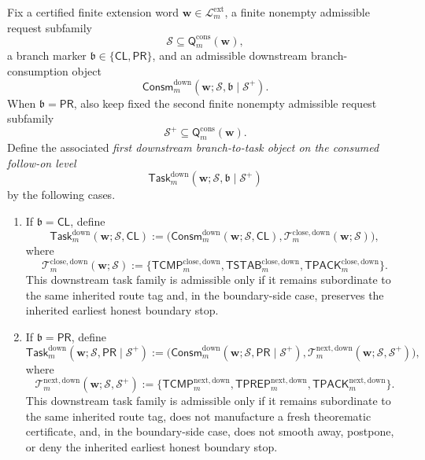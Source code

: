 \begin{definition}
\label{def:first-downstream-branch-to-task-object-on-the-consumed-follow-on-level}
Fix a certified finite extension word \(\mathbf w\in\mathcal L^{\mathrm{ext}}_{m}\), a finite nonempty admissible request subfamily
\[
 \mathcal S \subseteq \mathsf{Q}^{\mathrm{cons}}_{m}(\mathbf w),
\]
a branch marker \(\mathfrak b\in\{\mathsf{CL},\mathsf{PR}\}\), and an admissible downstream branch-consumption object
\[
 \mathsf{Consm}^{\mathrm{down}}_{m}(\mathbf w;\mathcal S,\mathfrak b\mid\mathcal S^{+}).
\]
When \(\mathfrak b=\mathsf{PR}\), also keep fixed the second finite nonempty admissible request subfamily
\[
 \mathcal S^{+}\subseteq \mathsf{Q}^{\mathrm{cons}}_{m}(\mathbf w).
\]
Define the associated \emph{first downstream branch-to-task object on the consumed follow-on level}
\[
 \mathsf{Task}^{\mathrm{down}}_{m}(\mathbf w;\mathcal S,\mathfrak b\mid\mathcal S^{+})
\]
by the following cases.
\begin{enumerate}[label=(\roman*)]
 \item If \(\mathfrak b=\mathsf{CL}\), define
\[
 \mathsf{Task}^{\mathrm{down}}_{m}(\mathbf w;\mathcal S,\mathsf{CL})
 :=
 \bigl(\mathsf{Consm}^{\mathrm{down}}_{m}(\mathbf w;\mathcal S,\mathsf{CL}),\mathcal T^{\mathrm{close,down}}_{m}(\mathbf w;\mathcal S)\bigr),
\]
where
\[
 \mathcal T^{\mathrm{close,down}}_{m}(\mathbf w;\mathcal S)
 :=
 \{\mathsf{TCMP}^{\mathrm{close,down}}_{m},\mathsf{TSTAB}^{\mathrm{close,down}}_{m},\mathsf{TPACK}^{\mathrm{close,down}}_{m}\}.
\]
This downstream task family is admissible only if it remains subordinate to the same inherited route tag and, in the boundary-side case, preserves the inherited earliest honest boundary stop.

 \item If \(\mathfrak b=\mathsf{PR}\), define
\[
 \mathsf{Task}^{\mathrm{down}}_{m}(\mathbf w;\mathcal S,\mathsf{PR}\mid\mathcal S^{+})
 :=
 \bigl(\mathsf{Consm}^{\mathrm{down}}_{m}(\mathbf w;\mathcal S,\mathsf{PR}\mid\mathcal S^{+}),\mathcal T^{\mathrm{next,down}}_{m}(\mathbf w;\mathcal S,\mathcal S^{+})\bigr),
\]
where
\[
 \mathcal T^{\mathrm{next,down}}_{m}(\mathbf w;\mathcal S,\mathcal S^{+})
 :=
 \{\mathsf{TCMP}^{\mathrm{next,down}}_{m},\mathsf{TPREP}^{\mathrm{next,down}}_{m},\mathsf{TPACK}^{\mathrm{next,down}}_{m}\}.
\]
This downstream task family is admissible only if it remains subordinate to the same inherited route tag, does not manufacture a fresh theorematic certificate, and, in the boundary-side case, does not smooth away, postpone, or deny the inherited earliest honest boundary stop.
\end{enumerate}
\end{definition}

